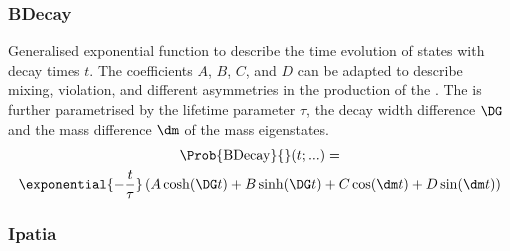\subsubsection{BDecay}
\label{sec:measurement_of_sin2beta:likelihood_fit:pdfs:bdecay}

Generalised exponential function to describe the time evolution of \Bmeson
states with decay times $t$. The coefficients $A$, $B$, $C$, and $D$ can be
adapted to describe \Bmeson mixing, \CP violation, and different asymmetries \eg
in the production of the \Bmesons. The \PDF is further parametrised by the
lifetime parameter $\tau$, the decay width difference $\DG$ and the mass
difference $\dm$ of the \Bmeson mass eigenstates.
%
\begin{multline}\label{eq:measurement_of_sin2beta:likelihood_fit:pdfs:bdecay}
  \Prob{\text{BDecay}}{}(t;...) = \\ \exponential{- \frac{t}{\tau}}\left( A \cosh (\DG t) + B \sinh (\DG t) + C \cos (\dm t) + D \sin (\dm t) \right)
\end{multline}

\subsubsection{Ipatia}
\label{sec:measurement_of_sin2beta:likelihood_fit:pdfs:ipatia}

